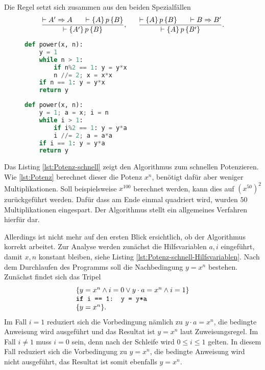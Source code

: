 Die Regel setzt sich zusammen aus den beiden Spezialfällen
\[\dfrac{\vdash A'\Rightarrow A\quad\;\;\vdash\{A\}\,p\,\{B\}}
{\vdash\{A'\}\,p\,\{B\}},\quad\;\;
\dfrac{\vdash\{A\}\,p\,\{B\}\quad\;\;\vdash B\Rightarrow B'}
{\vdash\{A\}\,p\,\{B'\}}.\]

\begin{figure}
\begin{center}
\begin{minipage}[t]{.48\textwidth}
\begin{lstlisting}[language=Python,caption={Schnelles Potenzieren},%
label=lst:Potenz-schnell]
def power(x, n):
    y = 1
    while n > 1:
        if n%2 == 1: y = y*x
        n //= 2; x = x*x
    if n == 1: y = y*x
    return y
\end{lstlisting}
\end{minipage}
\begin{minipage}[t]{.48\textwidth}
\begin{lstlisting}[language=Python,caption={Mit Hilfsvariablen},%
label=lst:Potenz-schnell-Hilfsvariablen]
def power(x, n):
    y = 1; a = x; i = n
    while i > 1:
        if i%2 == 1: y = y*a
        i //= 2; a = a*a
    if i == 1: y = y*a
    return y
\end{lstlisting}
\end{minipage}
\end{center}
\end{figure}

\noindent{}
Das Listing \ref{lst:Potenz-schnell} zeigt den Algorithmus zum schnellen
Potenzieren. Wie \ref{lst:Potenz} berechnet dieser die Potenz $x^n$,
benötigt dafür aber weniger Multiplikationen. Soll beispielsweise $x^{100}$
berechnet werden, kann dies auf $(x^{50})^2$ zurückgeführt werden. Dafür
dass am Ende einmal quadriert wird, wurden $50$ Multiplikationen
eingespart. Der Algorithmus stellt ein allgemeines Verfahren hierfür
dar.

Allerdings ist nicht mehr auf den ersten Blick ersichtlich, ob der
Algorithmus korrekt arbeitet. Zur Analyse werden zunächst die
Hilfsvariablen $a,i$ eingeführt, damit $x,n$ konstant bleiben, siehe
Listing \ref{lst:Potenz-schnell-Hilfsvariablen}. Nach dem Durchlaufen
des Programms soll die Nachbedingung $y=x^n$ bestehen. Zunächst findet
sich das Tripel
\[\begin{array}{l}
\{y = x^n\land i = 0 \lor y\cdot a = x^n\land i = 1\}\\
\text{\texttt{\textbf{if} i == 1: y = y*a}}\\
\{y = x^n\}.
\end{array}\]
Im Fall $i=1$ reduziert sich die Vorbedingung nämlich zu $y\cdot a=x^n$,
die bedingte Anweisung wird ausgeführt und das Resultat ist $y=x^n$ laut
Zuweisungsregel. Im Fall $i\ne 1$ muss $i=0$ sein, denn nach der
Schleife wird $0\le i\le 1$ gelten. In diesem Fall reduziert sich die
Vorbedingung zu $y=x^n$, die bedingte Anweisung wird nicht ausgeführt,
das Resultat ist somit ebenfalls $y=x^n$.

